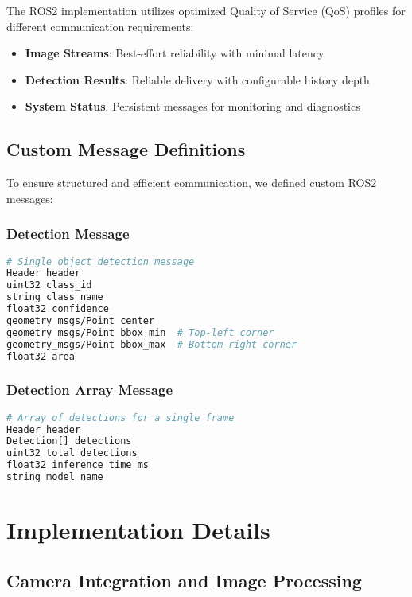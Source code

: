 \documentclass[11pt,a4paper]{article}
\begin{document}
The ROS2 implementation utilizes optimized Quality of Service (QoS) profiles for different communication requirements:

\begin{itemize}
    \item \textbf{Image Streams}: Best-effort reliability with minimal latency
    \item \textbf{Detection Results}: Reliable delivery with configurable history depth
    \item \textbf{System Status}: Persistent messages for monitoring and diagnostics
\end{itemize}

\subsection{Custom Message Definitions}

To ensure structured and efficient communication, we defined custom ROS2 messages:

\subsubsection{Detection Message}
\begin{lstlisting}[language=bash, caption=Detection.msg Structure]
# Single object detection message
Header header
uint32 class_id
string class_name
float32 confidence
geometry_msgs/Point center
geometry_msgs/Point bbox_min  # Top-left corner
geometry_msgs/Point bbox_max  # Bottom-right corner
float32 area
\end{lstlisting}

\subsubsection{Detection Array Message}
\begin{lstlisting}[language=bash, caption=DetectionArray.msg Structure]
# Array of detections for a single frame
Header header
Detection[] detections
uint32 total_detections
float32 inference_time_ms
string model_name
\end{lstlisting}

\newpage
\section{Implementation Details}

\subsection{Camera Integration and Image Processing}
\end{document}

